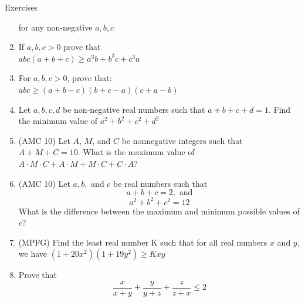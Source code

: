 \begin{xcb}{Exercises}
\begin{enumerate}
for any non-negative $a, b, c$\\
\item If $a, b, c > 0$ prove that\\
$abc(a + b + c) \geq a^3b + b^3c + c^3a$\\
\item For $a,b,c > 0$, prove that:\\
$abc \geq (a + b - c)(b + c - a)(c + a - b)$
\item Let $a, b, c, d$ be non-negative real numbers such that $a + b + c + d = 1$. Find the minimum value of $a^2 + b^2 + c^2 + d^2$\\
\item (AMC 10) Let $A$, $M$, and $C$ be nonnegative integers such that $A+M+C=10$. What is the maximum value of $A\cdot M\cdot C+A\cdot M+M\cdot C+C\cdot A$?
\item (AMC 10) Let $a,b,$ and $c$ be real numbers such that
\[a+b+c=2, \text{ and}\]\[a^2+b^2+c^2=12\]
What is the difference between the maximum and minimum possible values of $c$?
\item  (MPFG) Find the least real number K such that for all real numbers $x$ and $y$, we have
$(1 + 20x^2)(1 + 19y^2)\geq Kxy$
\item Prove that \[\frac{x}{x+y}+\frac{y}{y+z}+\frac{z}{z+x} \leq 2\]
\end{enumerate}
\end{xcb}